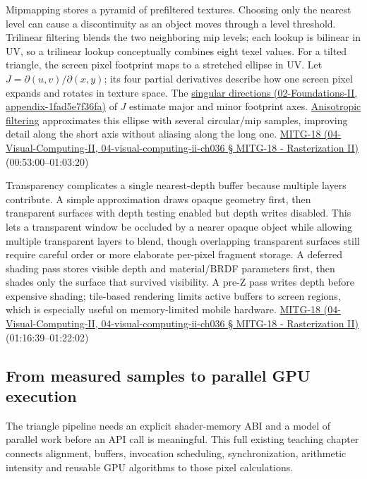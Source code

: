 Mipmapping stores a pyramid of prefiltered textures. Choosing only the nearest level can cause a discontinuity as an object moves through a level threshold. Trilinear filtering blends the two neighboring mip levels; each lookup is bilinear in UV, so a trilinear lookup conceptually combines eight texel values. For a tilted triangle, the screen pixel footprint maps to a stretched ellipse in UV. Let \(J=\partial(u,v)/\partial(x,y)\); its four partial derivatives describe how one screen pixel expands and rotates in texture space. The \href{}{singular directions (02-Foundations-II, appendix-1fad5e7f36fa)} of \(J\) estimate major and minor footprint axes. \hyperref[appendix-d5b3c692d9f0]{Anisotropic filtering} approximates this ellipse with several circular/mip samples, improving detail along the short axis without aliasing along the long one. \href{}{MITG-18 (04-Visual-Computing-II, 04-visual-computing-ii-ch036 § MITG-18 - Rasterization II)} (00:53:00--01:03:20)

Transparency complicates a single nearest-depth buffer because multiple layers contribute. A simple approximation draws opaque geometry first, then transparent surfaces with depth testing enabled but depth writes disabled. This lets a transparent window be occluded by a nearer opaque object while allowing multiple transparent layers to blend, though overlapping transparent surfaces still require careful order or more elaborate per-pixel fragment storage. A deferred shading pass stores visible depth and material/BRDF parameters first, then shades only the surface that survived visibility. A pre-Z pass writes depth before expensive shading; tile-based rendering limits active buffers to screen regions, which is especially useful on memory-limited mobile hardware. \href{}{MITG-18 (04-Visual-Computing-II, 04-visual-computing-ii-ch036 § MITG-18 - Rasterization II)} (01:16:39--01:22:02)

\subsection{From measured samples to parallel GPU execution}\label{from-measured-samples-to-parallel-gpu-execution}

The triangle pipeline needs an explicit shader-memory ABI and a model of parallel work before an API call is meaningful. This full existing teaching chapter connects alignment, buffers, invocation scheduling, synchronization, arithmetic intensity and reusable GPU algorithms to those pixel calculations.

